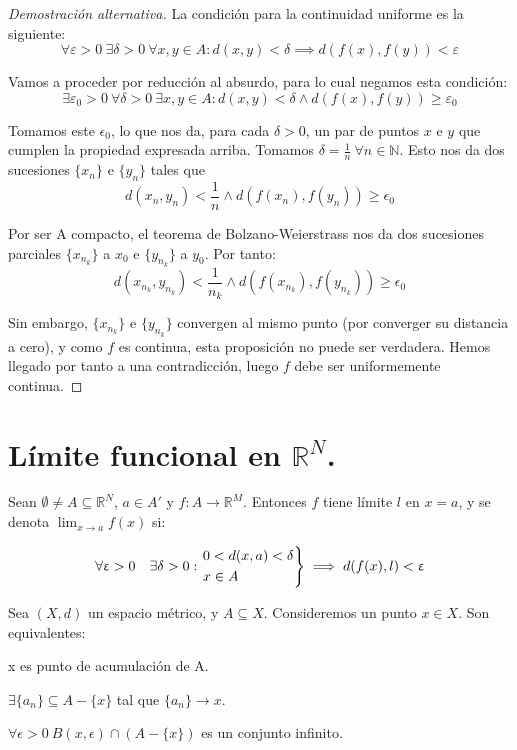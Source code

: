 \begin{proof}[Demostración alternativa]
	La condición para la continuidad uniforme es la siguiente:
	\[
		\forall \varepsilon > 0 \  \exists \delta > 0 \ \forall x, y \in A : d(x,y) < \delta \implies d (f(x) , f(y) ) < \varepsilon
	\]

	Vamos a proceder por reducción al absurdo, para lo cual negamos esta condición:
	\[
		\exists \varepsilon_0 > 0 \ \forall \delta > 0 \ \exists x, y \in A : d (x,y) < \delta \wedge d (f(x) , f(y) ) \ge \varepsilon_0
	\]

	Tomamos este $\epsilon_0$, lo que nos da, para cada $\delta>0$, un par de puntos $x$ e $y$ que cumplen la propiedad expresada arriba. Tomamos $\delta = \frac{1}{n} \ \forall n\in \mathbb{N}$. Esto nos da dos sucesiones $\{x_n\}$ e $\{y_n\}$ tales que
	\[
		d(x_n,y_n) < \frac{1}{n} \wedge d(f(x_n),f(y_n)) \ge \epsilon_0
	\]

	Por ser A compacto, el teorema de Bolzano-Weierstrass nos da dos sucesiones parciales $\{x_{n_k}\}$ a $x_0$ e $\{y_{n_k}\}$ a $y_0$. Por tanto:
	\[
		d(x_{n_k},y_{n_k}) < \frac{1}{n_k} \wedge d(f(x_{n_k}),f(y_{n_k})) \ge \epsilon_0
	\]

	Sin embargo, $\{x_{n_k}\}$ e $\{y_{n_k}\}$ convergen al mismo punto (por converger su distancia a cero), y como $f$ es continua, esta proposición no puede ser verdadera. Hemos llegado por tanto a una contradicción, luego $f$ debe ser uniformemente continua.
\end{proof}


\section{Límite funcional en $\mathbb{R}^N$.}

\begin{ndef}
	Sean $\emptyset \ne A \subseteq \mathbb{R}^N$, $a\in A'$ y $f: A \longrightarrow \mathbb{R}^M$. Entonces $f$ tiene límite $l$ en $x=a$, y se denota $\displaystyle\lim_{x\to a} f(x)$ si:

\[
	\forall \epsilon>0\quad \exists \delta>0 : \begin{rcases}
	0<d(x,a)<\delta\\
	x\in A
\end{rcases} \implies d(f(x), l) < \epsilon
\]
\end{ndef}



\begin{nprop}
Sea $(X,d)$ un espacio métrico, y $A\subseteq X$. Consideremos un punto $x\in X$. Son equivalentes:

\begin{nlist}
\item x es punto de acumulación de A.
\item $\exists \{a_n\}\subseteq A-\{x\}$ tal que $\{a_n\} \rightarrow x$.
\item $\forall \epsilon > 0\ B(x,\epsilon)\cap (A-\{x\})$ es un conjunto infinito.
\end{nlist}
\end{nprop}



